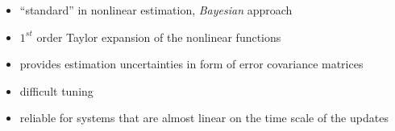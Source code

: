\begin{frame}
\begin{columns}
\vspace{-5pt}
	\begin{itemize}
		\item \begin{footnotesize}``standard'' in nonlinear estimation, \textit{Bayesian} approach\end{footnotesize} %
		\item \begin{footnotesize}$1^{st}$ order Taylor expansion of the nonlinear functions \end{footnotesize} 
		\item \begin{footnotesize}provides estimation uncertainties in form of error covariance matrices \end{footnotesize} 
		\item \begin{footnotesize}difficult tuning \end{footnotesize}
		\item \begin{footnotesize}reliable for systems that are almost linear on the time scale of the updates \end{footnotesize}
	\end{itemize}	
\end{columns}
\end{frame}